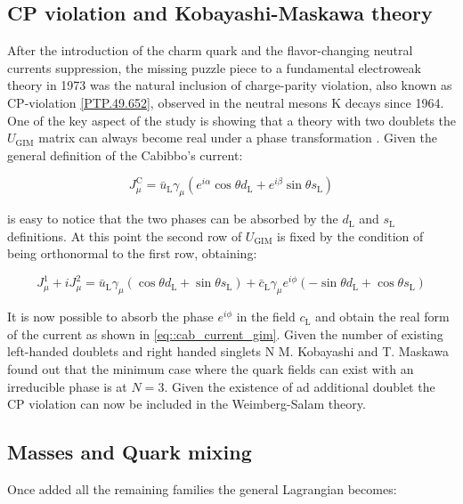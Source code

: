 \subsection{CP violation and Kobayashi-Maskawa theory}

After the introduction of the charm quark and the flavor-changing neutral currents suppression, the missing puzzle piece to a fundamental electroweak theory in 1973 was the natural inclusion of charge-parity violation, also known as CP-violation \ref{PTP.49.652}, observed in the neutral mesons K decays since 1964. 
One of the key aspect of the study is showing that a theory with two doublets the $U_{\text{GIM}}$ matrix can always become real under a phase transformation \cite{Glashow:1970gm}. Given the general definition of the Cabibbo's current:

\begin{equation}
J^{\text{C}}_{\mu} = \bar{u}_{\text{L}}\gamma_{\mu}\left( e^{i\alpha} \cos\theta d_{\text{L}} + e^{i\beta}\sin\theta s_{\text{L}}   \right)
\end{equation}

is easy to notice that the two phases can be absorbed by the $d_{\text{L}}$ and $s_{\text{L}}$ definitions. At this point the second row of $U_{\text{GIM}}$ is fixed by the condition of being orthonormal to the first row, obtaining:

\begin{equation}
J^{1}_{\mu} + i J^{2}_{\mu} =  \bar{u}_{\text{L}}\gamma_{\mu} \left(\cos\theta d_{\text{L}} +\sin\theta s_{\text{L}}\right) + \bar{c}_{\text{L}}\gamma_{\mu}e^{i\phi} (-\sin\theta d_{\text{L}} + \cos\theta s_{\text{L}})
\end{equation}

It is now possible to absorb the phase $e^{i\phi}$ in the field $c_{\text{L}}$ and obtain the real form of the current as shown in \autoref{eq::cab_current_gim}. Given the number of existing left-handed doublets and right handed singlets N M. Kobayashi and T. Maskawa found out that the minimum case where the quark fields can exist with an irreducible phase is at $N = 3$. Given the existence of ad additional doublet the CP violation can now be included in the Weimberg-Salam theory.

\subsection{Masses and Quark mixing}

Once added all the remaining families the general Lagrangian becomes:

